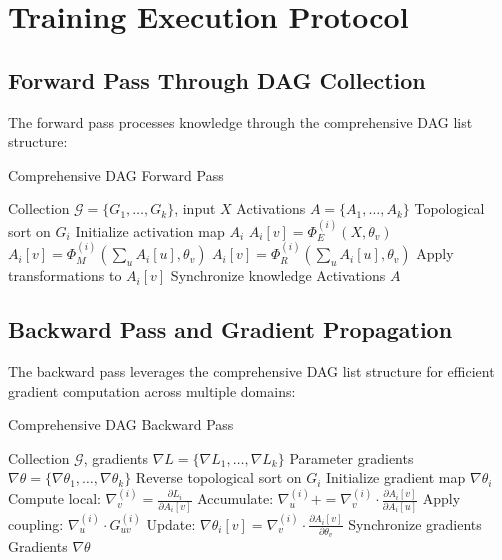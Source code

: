 \section{Training Execution Protocol}

\subsection{Forward Pass Through DAG Collection}

The forward pass processes knowledge through the comprehensive DAG list structure:

\begin{algorithm}[H]
\caption{Comprehensive DAG Forward Pass}
\begin{algorithmic}[1]
\REQUIRE Collection $\mathcal{G} = \{G_1, \ldots, G_k\}$, input $X$
\ENSURE Activations $A = \{A_1, \ldots, A_k\}$
    \STATE Topological sort on $G_i$
    \STATE Initialize activation map $A_i$
            \STATE $A_i[v] = \Phi_E^{(i)}(X, \theta_v)$
            \STATE $A_i[v] = \Phi_M^{(i)}(\sum_u A_i[u], \theta_v)$
            \STATE $A_i[v] = \Phi_R^{(i)}(\sum_u A_i[u], \theta_v)$
        \ENDIF
        \STATE Apply transformations to $A_i[v]$
    \ENDFOR
\ENDFOR
\STATE Synchronize knowledge
\RETURN Activations $A$
\end{algorithmic}
\end{algorithm}

\subsection{Backward Pass and Gradient Propagation}

The backward pass leverages the comprehensive DAG list structure for efficient gradient computation across multiple domains:

\begin{algorithm}[H]
\caption{Comprehensive DAG Backward Pass}
\begin{algorithmic}[1]
\REQUIRE Collection $\mathcal{G}$, gradients $\nabla L = \{\nabla L_1, \ldots, \nabla L_k\}$
\ENSURE Parameter gradients $\nabla \theta = \{\nabla \theta_1, \ldots, \nabla \theta_k\}$
    \STATE Reverse topological sort on $G_i$
    \STATE Initialize gradient map $\nabla \theta_i$
        \STATE Compute local: $\nabla_v^{(i)} = \frac{\partial L_i}{\partial A_i[v]}$
            \STATE Accumulate: $\nabla_u^{(i)} += \nabla_v^{(i)} \cdot \frac{\partial A_i[v]}{\partial A_i[u]}$
            \STATE Apply coupling: $\nabla_u^{(i)} \cdot G_{uv}^{(i)}$
        \ENDFOR
        \STATE Update: $\nabla \theta_i[v] = \nabla_v^{(i)} \cdot \frac{\partial A_i[v]}{\partial \theta_v}$
    \ENDFOR
\ENDFOR
\STATE Synchronize gradients
\RETURN Gradients $\nabla \theta$
\end{algorithmic}
\end{algorithm}

